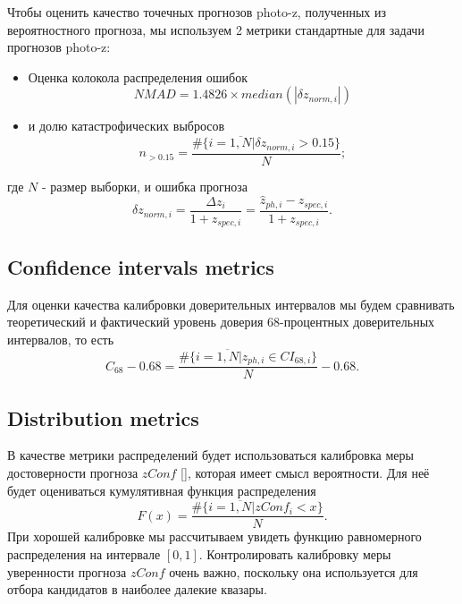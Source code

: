 \documentclass[fleqn,usenatbib]{mnras}
\begin{document}
Чтобы оценить качество точечных прогнозов photo-z, полученных из вероятностного прогноза, мы используем 2 метрики стандартные для задачи прогнозов photo-z:
\begin{itemize}
    \item Оценка колокола распределения ошибок \begin{equation}\label{eq:nmad}
        NMAD = 1.4826 \times median(|\delta z_{norm,i}|)
    \end{equation}
    \item и долю катастрофических выбросов \begin{equation}\label{eq:n015}
        n_{>0.15} = \frac{\#\{i = \overline{1, N} | \delta z_{norm, i} > 0.15\}}{N};
    \end{equation}
\end{itemize}
где \(N\) - размер выборки, и ошибка прогноза \begin{equation}\label{eq:dznorm}
    \delta z_{norm,i} = \frac{\Delta z_i}{1+z_{spec,i}} = \frac{\hat{z}_{ph,i} - z_{spec,i}}{1+z_{spec,i}}.
\end{equation}

\subsection{Confidence intervals metrics}\label{sec:ci-metrics}

Для оценки качества калибровки доверительных интервалов мы будем сравнивать теоретический и фактический уровень доверия 68-процентных доверительных интервалов, то есть \begin{equation}\label{eq:c68}
    C_{68} - 0.68 = \frac{\#\{i = \overline{1, N} | z_{ph,i} \in CI_{68, i}\}}{N} - 0.68.
\end{equation}

\subsection{Distribution metrics}\label{sec:dist-metrics}

В качестве метрики распределений будет использоваться калибровка меры достоверности прогноза \(zConf\) \eqref{}, которая имеет смысл вероятности. Для неё будет оцениваться кумулятивная функция распределения \begin{equation}\label{eq:zconf_cal}
    F(x) = \frac{\#\{i = \overline{1, N} | zConf_i < x \}}{N}.
\end{equation}
При хорошей калибровке мы рассчитываем увидеть функцию равномерного распределения на интервале $[0, 1]$. Контролировать калибровку меры уверенности прогноза $zConf$ очень важно, поскольку она используется для отбора кандидатов в наиболее далекие квазары.
\end{document}
